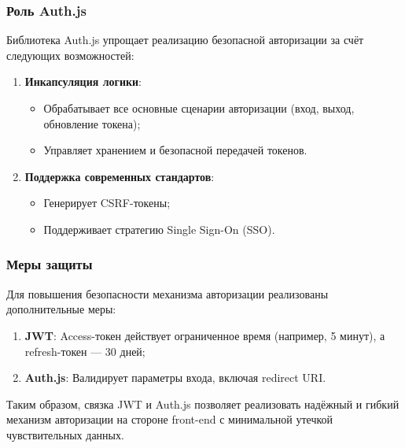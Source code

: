 \subsubsection{Роль Auth.js}
Библиотека Auth.js упрощает реализацию безопасной авторизации за счёт следующих возможностей:
\begin{enumerate}
  \item \textbf{Инкапсуляция логики}:
    \begin{itemize}
      \item Обрабатывает все основные сценарии авторизации (вход, выход, обновление токена);
      \item Управляет хранением и безопасной передачей токенов.
    \end{itemize}
  \item \textbf{Поддержка современных стандартов}:
    \begin{itemize}
      \item Генерирует CSRF-токены;
      \item Поддерживает стратегию Single Sign-On (SSO).
    \end{itemize}
\end{enumerate}

\subsubsection{Меры защиты}
Для повышения безопасности механизма авторизации реализованы дополнительные меры:

\begin{enumerate}
  \item \textbf{JWT}: Access-токен действует ограниченное время (например, 5 минут), а refresh-токен — 30 дней;
  \item \textbf{Auth.js}: Валидирует параметры входа, включая redirect URI.
\end{enumerate}

Таким образом, связка JWT и Auth.js позволяет реализовать надёжный и гибкий механизм авторизации на стороне front-end с минимальной утечкой чувствительных данных.